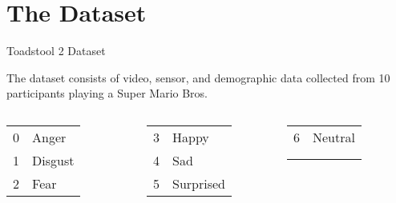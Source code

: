 \section[\empty]{The Dataset}



\begin{frame}{Toadstool 2 Dataset}
\begin{block}{}
The dataset consists of video, sensor, and demographic data collected from 10 participants playing a Super Mario Bros.
\end{block}

\vspace{-0.5cm}

		\begin{columns}[T] %
		\begin{column}{0.5\textwidth}
			\begin{center}

  \begin{columns}[t]
	\centering\footnotesize
	\begin{tabular}{r l}
		0 & Anger   \\
		1 & Disgust \\
		2 & Fear    
	\end{tabular}
	
	\centering\footnotesize
	\begin{tabular}{r l}
		3 & Happy     \\
		4 & Sad       \\
		5 & Surprised 
	\end{tabular}
	
	\centering\footnotesize
	\begin{tabular}{r l}
		6 & Neutral\\
		  &  \\
		  &
	\end{tabular}
\end{columns}


\end{center}
\end{column}
\end{columns}
\end{frame}
